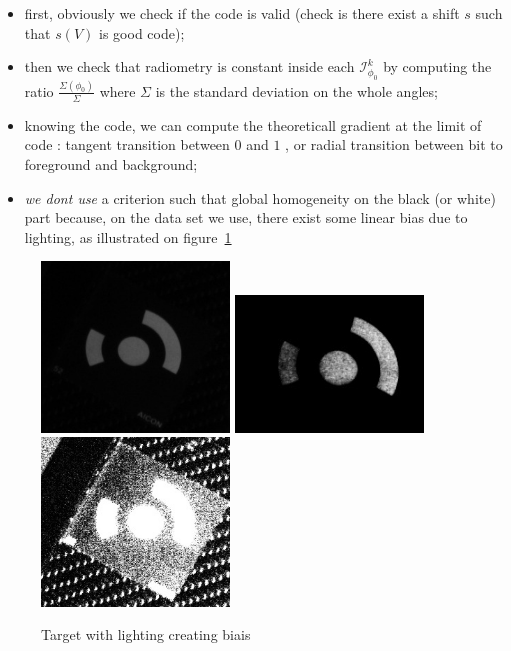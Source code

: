 \begin{itemize}
       \item first, obviously we check if the code is valid (check is there exist a shift $s$ such
	     that $s(V)$ is good code);

       \item then we check that radiometry is constant inside each $\mathcal{I}^{k}_{\phi_0}$
             by computing the ratio $\frac{\Sigma(\phi_0)}{\Sigma}$ where  $\Sigma$ is
             the standard deviation on the whole angles;

        \item  knowing the code, we can compute the theoreticall gradient at the limit of code :
               tangent transition between $0$ and $1$ , or radial transition between bit to foreground
               and background;

        \item \emph{we dont use} a criterion such that global homogeneity on the black (or white) part
              because, on the data set we use, there exist some linear bias due to lighting,
		as illustrated on figure~\ref{fig:CodeT:EllipseBias}
	
\end{itemize}


\begin{figure}
\centering
	\includegraphics[width=5cm]{Methods/Images/Cro-Init.jpg}
	\includegraphics[width=5cm]{Methods/Images/Cro-EnhW.jpg}
	\includegraphics[width=5cm]{Methods/Images/Cro-EnhB.jpg}
	\caption{Target with lighting creating biais}
\label{fig:CodeT:EllipseBias}
\end{figure}









